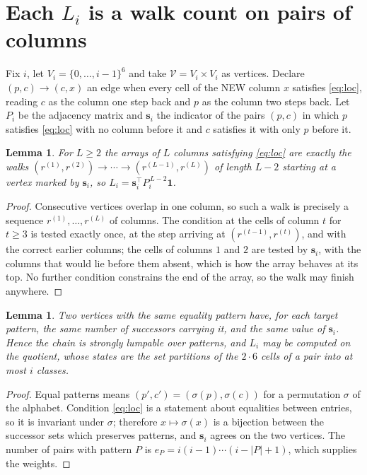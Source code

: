 \documentclass[11pt,a4paper]{article}
\theoremstyle{plain}
\newtheorem{lemma}[theorem]{Lemma}
\theoremstyle{definition}
\begin{document}
\section{Each $L_i$ is a walk count on pairs of columns}

Fix $i$, let $V_i=\{0,\dots,i-1\}^{6}$ and take $\mathcal V=V_i\times V_i$ as vertices.
Declare $(p,c)\to(c,x)$ an edge when every cell of the NEW column $x$ satisfies
\eqref{eq:loc}, reading $c$ as the column one step back and $p$ as the column two steps
back. Let $P_i$ be the adjacency matrix and $\mathbf{s}_i$ the indicator of the pairs
$(p,c)$ in which $p$ satisfies \eqref{eq:loc} with no column before it and $c$ satisfies it
with only $p$ before it.

\begin{lemma}\label{lem:walk}
For $L\ge2$ the arrays of $L$ columns satisfying \eqref{eq:loc} are exactly the walks
$(r^{(1)},r^{(2)})\to\cdots\to(r^{(L-1)},r^{(L)})$ of length $L-2$ starting at a
vertex marked by $\mathbf{s}_i$, so
$L_i=\mathbf{s}_i^{\!\top}P_i^{\,L-2}\mathbf{1}$.
\end{lemma}

\begin{proof}
Consecutive vertices overlap in one column, so such a walk is precisely a sequence
$r^{(1)},\dots,r^{(L)}$ of columns. The condition at the cells of column $t$ for $t\ge3$
is tested exactly once, at the step arriving at $(r^{(t-1)},r^{(t)})$, and with the
correct earlier columns; the cells of columns $1$ and $2$ are tested by $\mathbf{s}_i$, with
the columns that would lie before them absent, which is how the array behaves at its top. No
further condition constrains the end of the array, so the walk may finish anywhere.
\end{proof}

\begin{lemma}\label{lem:lump}
Two vertices with the same equality pattern have, for each target pattern, the same number of
successors carrying it, and the same value of $\mathbf{s}_i$. Hence the chain is strongly
lumpable over patterns, and $L_i$ may be computed on the quotient, whose states are the set
partitions of the $2\cdot6$ cells of a pair into at most $i$ classes.
\end{lemma}

\begin{proof}
Equal patterns means $(p',c')=(\sigma(p),\sigma(c))$ for a permutation $\sigma$ of the
alphabet. Condition \eqref{eq:loc} is a statement about equalities between entries, so it is
invariant under $\sigma$; therefore $x\mapsto\sigma(x)$ is a bijection between the successor
sets which preserves patterns, and $\mathbf{s}_i$ agrees on the two vertices. The number of
pairs with pattern $P$ is $e_P=i(i-1)\cdots(i-|P|+1)$, which supplies the weights.
\end{proof}
\end{document}
